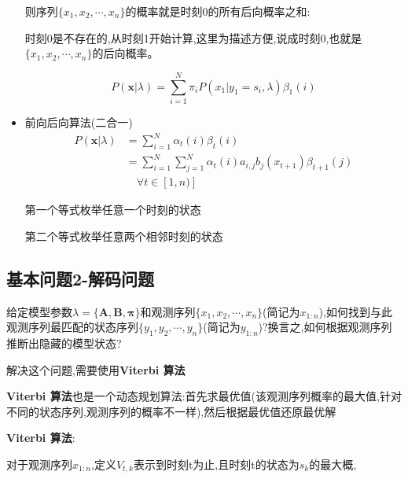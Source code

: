\documentclass[UTF8,a4paper]{ctexart}%
\begin{document}
\begin{itemize}
                  则序列$\{x_1,x_2 , \cdots , x_n\}$的概率就是时刻$0$的所有后向概率之和:

                  {\color{blue}
                      时刻0是不存在的,从时刻1开始计算,这里为描述方便,说成时刻0,也就是
                      $\{x_{1},x_{2} , \cdots , x_n\}$的后向概率。
                  }

                  \begin{equation}
                    P(\bm{x}|\lambda) = \sum_{i = 1}^N \pi_iP(x_1|y_1 = s_i,\lambda)\beta_1(i)
                  \end{equation}

              \item 前向后向算法(二合一)
                  \begin{equation}\begin{split}
                    P(\bm{x}|\lambda) &= \sum_{i = 1}^N \alpha_t(i) \beta_t(i)\\
                    &= \sum_{i = 1}^N \sum_{j = 1}^N \alpha_t(i) a_{i,j} b_j(x_{t+1}) \beta_{t+1}(j) \\&\quad \forall t \in [1,n)]
                  \end{split}\end{equation}

                  {\color{blue}
                    第一个等式枚举任意一个时刻的状态

                    第二个等式枚举任意两个相邻时刻的状态
                  }
            \end{itemize}

        \subsection{基本问题2-解码问题}
            给定模型参数$\lambda = \{\bm{A,B,\pi}\}$和观测序列$\{x_1, x_2, \cdots , x_n\}$(简记为$x_{1:n}$),如何找到与此观测序列最匹配的状态序列$\{y_1,y_2 , \cdots , y_n\}$(简记为$y_{1:n}$)?换言之,如何根据观测序列推断出隐藏的模型状态?

            解决这个问题,需要使用\textbf{Viterbi 算法}

            {\color{blue}
            \textbf{Viterbi 算法}也是一个动态规划算法:首先求最优值(该观测序列概率的最大值,针对不同的状态序列,观测序列的概率不一样),然后根据最优值还原最优解
            }

            \textbf{Viterbi 算法}:

            对于观测序列$x_{1:n}$,定义$V_{t,k}$表示到时刻t为止,且时刻t的状态为$s_k$的最大概,
\end{document}
